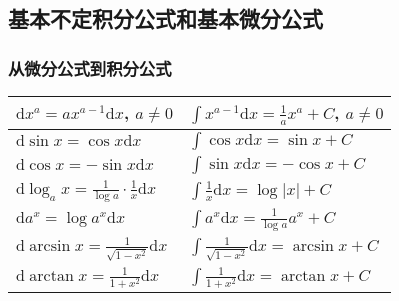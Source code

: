 \documentclass[
10pt,
aspectratio=43,
]{beamer}
\begin{document}
\subsection{基本不定积分公式和基本微分公式}
\begin{frame}
	\frametitle{从微分公式到积分公式}
	\everymath{\displaystyle}
	\renewcommand{\arraystretch}{2.3}
	\resizebox{\linewidth}{!}
	{
		\begin{tabular}{|p{}|p{}|}
			\hline
			$\mathrm{d}x^a=ax^{a-1}\mathrm{d}x$, $a\neq0$                   & $\int x^{a-1}\mathrm{d}x=\frac{1}{a}x^{a}+C$, $a\neq0$  \\
			\hline
			$\mathrm{d}\sin x=\cos x\mathrm{d}x$                            & $\int \cos x\mathrm{d}x = \sin x+C$                     \\
			\hline
			$\mathrm{d}\cos x=-\sin x\mathrm{d}x$                           & $\int \sin x\mathrm{d}x=-\cos x +C$                     \\
			\hline
			$\mathrm{d}\log_ax=\frac{1}{\log a}\cdot\frac{1}{x}\mathrm{d}x$ & $\int \frac{1}{x}\mathrm{d}x = \log |x|+C$              \\
			\hline
			$\mathrm{d}a^x=\log a^x\mathrm{d}x$                             & $\int a^x\mathrm{d}x = \frac{1}{\log a}a^x+C$           \\
			\hline
			$\mathrm{d}\arcsin x =\frac{1}{\sqrt{1-x^2}}\mathrm{d}x$        & $\int \frac{1}{\sqrt{1-x^2}}\mathrm{d}x = \arcsin x +C$ \\
			\hline
			$\mathrm{d}\arctan x =\frac{1}{1+x^2}\mathrm{d}x$               & $\int \frac{1}{1+x^2}\mathrm{d}x = \arctan x +C$        \\
			\hline
		\end{tabular}
	}
\end{frame}
\end{document}
